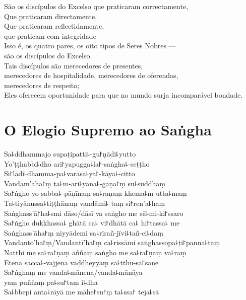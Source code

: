 São os discípulos do Excelso que praticaram correctamente,\\
Que praticaram directamente,\\
Que praticaram reflectidamente,\\
 que praticam com integridade ---\\
Isso é, os quatro pares, os oito tipos de Seres Nobres ---\\
 são os discípulos do Excelso.\\
Tais discípulos são merecedores de presentes,\\
\vin merecedores de hospitalidade, merecedores de oferendas,\\
\vin merecedores de respeito;\\
Eles oferecem oportunidade para que no mundo surja incomparável bondade.

\clearpage

\chapter*{O Elogio Supremo ao Saṅgha}

\begin{leader}
\end{leader}

Sa꜕ddhammajo supaṭipatti꜕-gu꜓ṇādi꜕yutto\\
Yo'ṭṭhabbi꜕dho ari꜓yapugga꜕la꜓-saṅgha꜕-seṭṭho\\
Sī꜓lādi꜕dhamma-pa꜕varāsa꜕ya꜓-kāya꜕-citto\\
Vandām'aha꜓ṃ ta꜕m-ari꜕yāna꜕-gaṇa꜓ṃ su꜕suddhaṃ\\
Sa꜓ṅgho yo sabba꜕-pāṇīnaṃ sa꜕raṇaṃ khema꜕m-utta꜕maṃ\\
Ta꜕tiyānussa꜕tiṭṭhānaṃ vandāmi꜕ taṃ si꜓ren'a꜕haṃ\\
Saṅghass'ā꜓ha꜕smi dāso/dāsī va saṅgho me sā꜕mi-ki꜓ssaro\\
Sa꜓ṅgho dukkhassa꜕ ghātā ca꜕ vi꜓dhātā ca꜕ hi꜓tassa꜕ me\\
Saṅghass'āha꜓ṃ niyyādemi sa꜕rīrañ-jīvi꜕tañ-ci꜕daṃ\\
Vandanto'ha꜓ṃ/Vandantī'ha꜓ṃ ca꜕rissāmi saṅghassopa꜕ṭi꜓panna꜕taṃ\\
Natthi me sa꜕ra꜓ṇaṃ aññaṃ saṅgho me sa꜕ra꜓ṇaṃ va꜕raṃ\\
Etena sacca꜕-vajjena vaḍḍheyyaṃ sa꜕tthu-sā꜓sane\\
Sa꜓ṅghaṃ me vanda꜕mānena/vanda꜕mānāya\\
\vin yaṃ puññaṃ pa꜕su꜓taṃ i꜕dha\\
Sa꜕bbepi anta꜕rāyā me māhe꜓su꜓ṃ ta꜕ssa꜓ teja꜕sā

